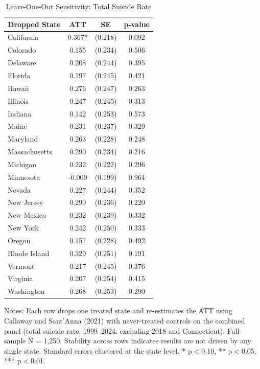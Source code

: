 \begin{table}[H]
\centering
\caption{Leave-One-Out Sensitivity: Total Suicide Rate}
\label{tab:loo}
\begin{threeparttable}
\begin{tabular}{lccc}
\toprule
Dropped State & ATT & SE & p-value \\
\midrule
California & 0.367* & (0.218) & 0.092 \\
Colorado & 0.155 & (0.234) & 0.506 \\
Delaware & 0.208 & (0.244) & 0.395 \\
Florida & 0.197 & (0.245) & 0.421 \\
Hawaii & 0.276 & (0.247) & 0.263 \\
Illinois & 0.247 & (0.245) & 0.313 \\
Indiana & 0.142 & (0.253) & 0.573 \\
Maine & 0.231 & (0.237) & 0.329 \\
Maryland & 0.263 & (0.228) & 0.248 \\
Massachusetts & 0.290 & (0.234) & 0.216 \\
Michigan & 0.232 & (0.222) & 0.296 \\
Minnesota & -0.009 & (0.199) & 0.964 \\
Nevada & 0.227 & (0.244) & 0.352 \\
New Jersey & 0.290 & (0.236) & 0.220 \\
New Mexico & 0.232 & (0.239) & 0.332 \\
New York & 0.242 & (0.250) & 0.333 \\
Oregon & 0.157 & (0.228) & 0.492 \\
Rhode Island & 0.329 & (0.251) & 0.191 \\
Vermont & 0.217 & (0.245) & 0.376 \\
Virginia & 0.207 & (0.254) & 0.415 \\
Washington & 0.268 & (0.253) & 0.290 \\
\bottomrule
\end{tabular}
\begin{tablenotes}[flushleft]
\small
\item Notes: Each row drops one treated state and re-estimates the ATT using Callaway and Sant'Anna (2021) with never-treated controls on the combined panel (total suicide rate, 1999--2024, excluding 2018 and Connecticut). Full-sample N = 1,250. Stability across rows indicates results are not driven by any single state. Standard errors clustered at the state level. * p$<$0.10, ** p$<$0.05, *** p$<$0.01.
\end{tablenotes}
\end{threeparttable}
\end{table}
